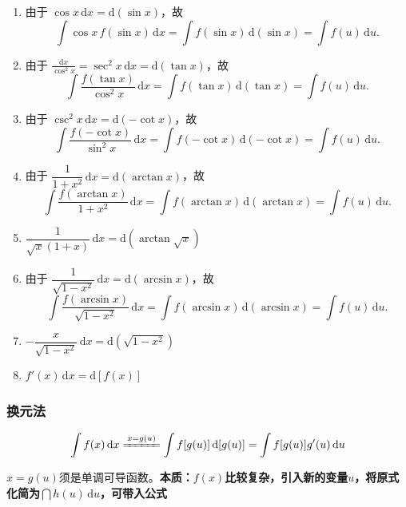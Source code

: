 \documentclass[../book.tex]{subfiles}
\begin{document}
\begin{enumerate}
        \item 由于 $\cos x\,\mathrm{d}x = \mathrm{d}(\sin x)$，故
        \[
            \int \cos x\,f(\sin x)\,\mathrm{d}x
            = \int f(\sin x)\,\mathrm{d}(\sin x)
            = \int f(u)\,\mathrm{d}u.
        \]

        \item 由于 $\displaystyle\frac{\mathrm{d}x}{\cos^2 x} = \sec^2 x\,\mathrm{d}x = \mathrm{d}(\tan x)$，故
        \[
            \int \frac{f(\tan x)}{\cos^2 x}\,\mathrm{d}x
            = \int f(\tan x)\,\mathrm{d}(\tan x)
            = \int f(u)\,\mathrm{d}u.
        \]

        \item 由于 $\csc^2 x\,\mathrm{d}x = \mathrm{d}(-\cot x)$，故
        \[
            \int \frac{f(-\cot x)}{\sin^2 x}\,\mathrm{d}x
            = \int f(-\cot x)\,\mathrm{d}(-\cot x)
            = \int f(u)\,\mathrm{d}u.
        \]

        \item 由于 $\dfrac{1}{1+x^2}\,\mathrm{d}x = \mathrm{d}(\arctan x)$，故
        \[
            \int \frac{f(\arctan x)}{1+x^2}\,\mathrm{d}x
            = \int f(\arctan x)\,\mathrm{d}(\arctan x)
            = \int f(u)\,\mathrm{d}u.
        \]
        \item $\dfrac{1}{\sqrt{x}(1+x)}\,\mathrm{d}x = \mathrm{d}(\arctan \sqrt{x})$

        \item 由于 $\dfrac{1}{\sqrt{1-x^2}}\,\mathrm{d}x = \mathrm{d}(\arcsin x)$，故
        \[
            \int \frac{f(\arcsin x)}{\sqrt{1-x^2}}\,\mathrm{d}x
            = \int f(\arcsin x)\,\mathrm{d}(\arcsin x)
            = \int f(u)\,\mathrm{d}u.
        \]
        \item $-\dfrac{x}{\sqrt{1 - x^2}}\,\mathrm{d}x = \mathrm{d}(\sqrt{1 - x^2})$
        \item $f'(x)\,\mathrm{d}x = \mathrm{d}[f(x)]$

    \end{enumerate}

    \subsubsection{换元法}

    \[
        \int f(x)\,\mathrm{d}x \xlongequal{x = g(u)} \int f[g(u)]\,\mathrm{d}[g(u)] = \int f[g(u)]g'(u)\,\mathrm{d}u
    \]

    $x = g(u)$须是单调可导函数。\textbf{本质：$f(x)$比较复杂，引入新的变量$u$，将原式化简为$\dint h(u)\,\mathrm{d}u$，可带入公式}
\end{document}
